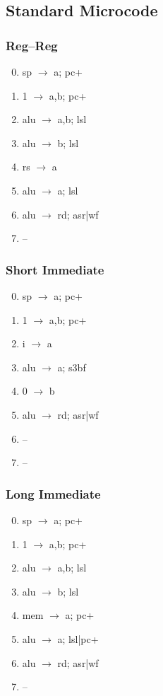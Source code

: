 \documentclass[11pt]{book}
\begin{document}
\subsection*{Standard Microcode}
\begin{multicols}{3}\ttfamily\selectfont\small
  \subsubsection*{Reg--Reg}
  \begin{enumerate}\setcounter{enumi}{-1}
  \item sp \(\rightarrow\) a; pc+
  \item 1 \(\rightarrow\) a,b; pc+
  \item alu \(\rightarrow\) a,b; lsl
  \item alu \(\rightarrow\) b; lsl
  \item rs \(\rightarrow\) a
  \item alu \(\rightarrow\) a; lsl
  \item alu \(\rightarrow\) rd; asr|wf
  \item --
  \end{enumerate}
  \columnbreak
  \subsubsection*{Short Immediate}
  \begin{enumerate}\setcounter{enumi}{-1}
  \item sp \(\rightarrow\) a; pc+
  \item 1 \(\rightarrow\) a,b; pc+
  \item i \(\rightarrow\) a
  \item alu \(\rightarrow\) a; s3bf
  \item 0 \(\rightarrow\) b
  \item alu \(\rightarrow\) rd; asr|wf
  \item --
  \item --
  \end{enumerate}
  \columnbreak
  \subsubsection*{Long Immediate}
  \begin{enumerate}\setcounter{enumi}{-1}
  \item sp \(\rightarrow\) a; pc+
  \item 1 \(\rightarrow\) a,b; pc+
  \item alu \(\rightarrow\) a,b; lsl
  \item alu \(\rightarrow\) b; lsl
  \item mem \(\rightarrow\) a; pc+
  \item alu \(\rightarrow\) a; lsl|pc+
  \item alu \(\rightarrow\) rd; asr|wf
  \item --
  \end{enumerate}
\end{multicols}
\end{document}
